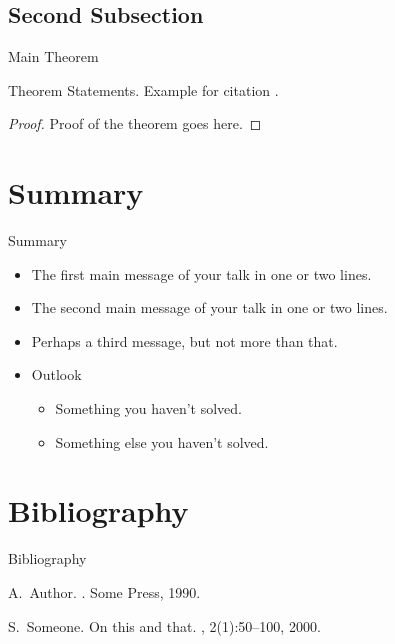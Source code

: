 \documentclass[xcolor=dvipsnames]{beamer}
\begin{document}
\subsection{Second Subsection}
\begin{frame}{Main Theorem}
\begin{theorem}
Theorem Statements. Example for citation \cite{Author1990}.
\end{theorem}

\begin{proof}
Proof of the theorem goes here.
\end{proof}
\end{frame}

\section*{Summary}

\begin{frame}{Summary}
  \begin{itemize}
  \item
    The \alert{first main message} of your talk in one or two lines.
  \item
    The \alert{second main message} of your talk in one or two lines.
  \item
    Perhaps a \alert{third message}, but not more than that.
  \end{itemize}
  
  \begin{itemize}
  \item
    Outlook
    \begin{itemize}
    \item
      Something you haven't solved.
    \item
      Something else you haven't solved.
    \end{itemize}
  \end{itemize}
\end{frame}

\section*{Bibliography}
\begin{frame}{Bibliography}
  \begin{thebibliography}{10}

    A.~Author.
    .
    \newblock Some Press, 1990.

    S.~Someone.
    \newblock On this and that.
    , 2(1):50--100,
    2000.

  \end{thebibliography}
\end{frame}
\end{document}
